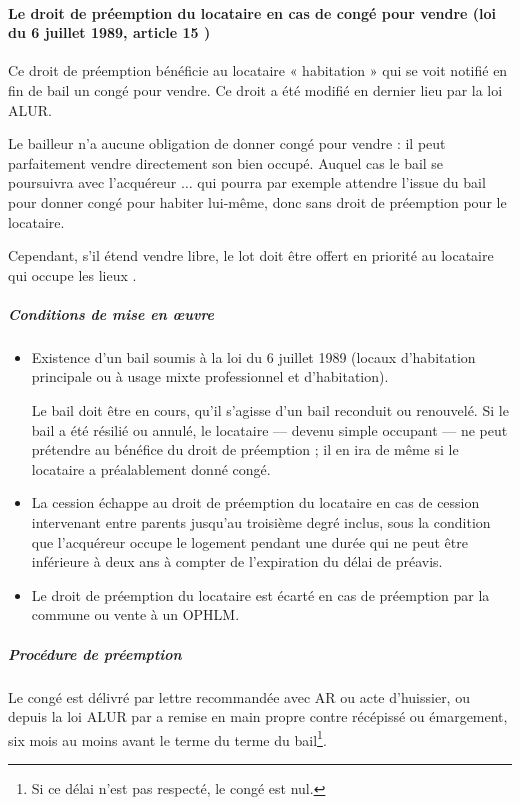 			\paragraph{Le droit de préemption du locataire en cas de congé pour	vendre (loi du 6 juillet 1989, article 15 \II)}
			
				\par Ce droit de préemption bénéficie au locataire « habitation » qui se voit notifié en fin de bail un congé pour vendre. Ce droit a été modifié en dernier lieu par la loi ALUR.
				
				Le bailleur n’a aucune obligation de donner congé pour vendre : il peut parfaitement vendre directement
				son bien occupé. Auquel cas le bail se poursuivra avec l’acquéreur $\dots$ qui pourra par exemple attendre
				l’issue du bail pour donner congé pour habiter lui-même, donc sans droit de préemption pour le locataire.
				
				Cependant, s’il étend vendre libre, le lot doit être offert en priorité au locataire qui occupe les lieux .
				
				\subparagraph{Conditions de mise en œuvre}
				
				\begin{itemize}
					\item Existence d’un bail soumis à la loi du 6 juillet 1989 (locaux d’habitation principale ou à usage mixte professionnel et d'habitation).
					
					Le bail doit être en cours, qu’il s’agisse d’un bail reconduit ou renouvelé. Si le bail a été résilié ou
					annulé, le locataire --– devenu simple occupant --– ne peut prétendre au bénéfice du droit de
					préemption ; il en ira de même si le locataire a préalablement donné congé.
					
					\item  La cession échappe au droit de préemption du locataire en cas de cession intervenant entre parents
					jusqu'au troisième degré inclus, sous la condition que l'acquéreur occupe le logement pendant une
					durée qui ne peut être inférieure à deux ans à compter de l'expiration du délai de préavis.
					
					\item  Le droit de préemption du locataire est écarté en cas de préemption par la commune ou vente à un
					OPHLM.
				\end{itemize}
				
				\subparagraph{Procédure de préemption}
				
				Le congé est délivré par lettre recommandée avec AR ou acte d’huissier, ou depuis la loi ALUR par a remise
				en main propre contre récépissé ou émargement, six mois au moins avant le terme du terme du bail\footnote{Si ce délai n’est pas respecté, le congé est nul.}.
				
